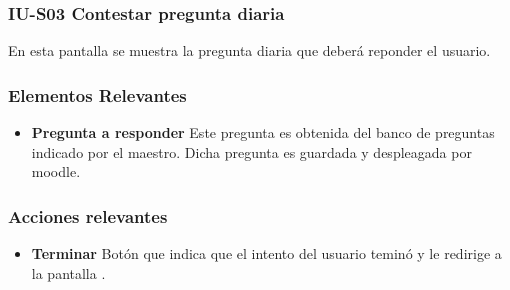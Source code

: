 
\subsubsection{IU-S03  Contestar pregunta diaria}

 En esta pantalla se muestra la pregunta diaria que deberá reponder el usuario.


\subsubsection{Elementos Relevantes}

    \begin{itemize}
    \item {\bf Pregunta a responder}
        Este pregunta es obtenida del banco de preguntas indicado por el maestro. Dicha pregunta es guardada y despleagada por moodle.
    \end{itemize}

\subsubsection{Acciones relevantes}

    \begin{itemize}
    \item {\bf Terminar}
        Botón que indica que el intento del usuario teminó y le redirige a la pantalla .
    \end{itemize}

\clearpage
